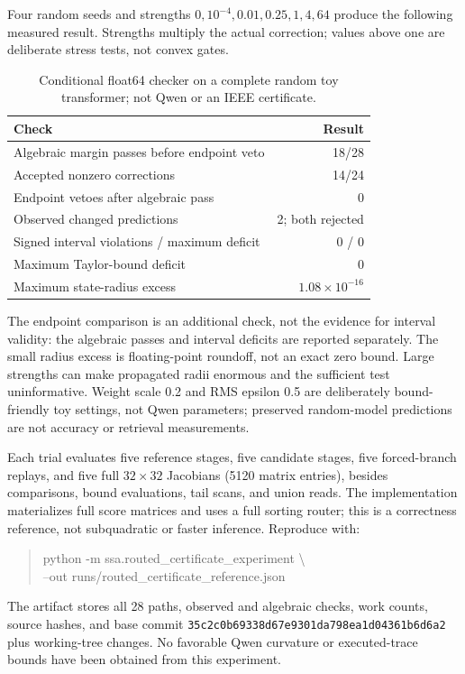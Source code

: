 \documentclass[11pt]{article}
\numberwithin{equation}{section}
\begin{document}
Four random seeds and strengths $0,10^{-4},0.01,0.25,1,4,64$ produce the following measured result.
Strengths multiply the actual correction; values above one are deliberate stress tests, not convex gates.
\begin{table}[ht]
\centering\small
\begin{tabular}{lr}\toprule
Check & Result\\\midrule
Algebraic margin passes before endpoint veto & 18/28\\
Accepted nonzero corrections & 14/24\\
Endpoint vetoes after algebraic pass & 0\\
Observed changed predictions & 2; both rejected\\
Signed interval violations / maximum deficit & 0 / 0\\
Maximum Taylor-bound deficit & 0\\
Maximum state-radius excess & $1.08\times10^{-16}$\\\bottomrule
\end{tabular}
\caption{Conditional float64 checker on a complete random toy transformer; not Qwen or an IEEE certificate.}
\end{table}

The endpoint comparison is an additional check, not the evidence for interval validity: the algebraic
passes and interval deficits are reported separately. The small radius excess is floating-point roundoff,
not an exact zero bound. Large strengths can make propagated radii enormous and the sufficient test
uninformative. Weight scale 0.2 and RMS epsilon 0.5 are deliberately bound-friendly toy settings, not
Qwen parameters; preserved random-model predictions are not accuracy or retrieval measurements.

Each trial evaluates five reference stages, five candidate stages, five forced-branch replays, and five
full $32\times32$ Jacobians (5120 matrix entries), besides comparisons, bound evaluations, tail scans,
and union reads. The implementation materializes full score matrices and uses a full sorting router;
this is a correctness reference, not subquadratic or faster inference. Reproduce with:
\begin{quote}\small\ttfamily\raggedright
python -m ssa.routed\_certificate\_experiment \textbackslash{}\\
--out runs/routed\_certificate\_reference.json
\end{quote}
The artifact stores all 28 paths, observed and algebraic checks, work counts, source hashes, and base
commit \texttt{35c2c0b69338d67e9301\allowbreak da798ea1d04361b6d6a2} plus working-tree changes. No
favorable Qwen curvature or executed-trace bounds have been obtained from this experiment.
\end{document}
